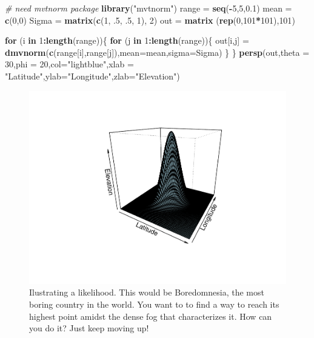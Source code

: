 \documentclass[
]{book}
\newenvironment{Shaded}{\begin{snugshade}}{\end{snugshade}}
\newcommand{\AttributeTok}[1]{\textcolor[rgb]{0.13,0.29,0.53}{#1}}
\newcommand{\CommentTok}[1]{\textcolor[rgb]{0.56,0.35,0.01}{\textit{#1}}}
\newcommand{\ControlFlowTok}[1]{\textcolor[rgb]{0.13,0.29,0.53}{\textbf{#1}}}
\newcommand{\DecValTok}[1]{\textcolor[rgb]{0.00,0.00,0.81}{#1}}
\newcommand{\FloatTok}[1]{\textcolor[rgb]{0.00,0.00,0.81}{#1}}
\newcommand{\FunctionTok}[1]{\textcolor[rgb]{0.13,0.29,0.53}{\textbf{#1}}}
\newcommand{\NormalTok}[1]{#1}
\newcommand{\OtherTok}[1]{\textcolor[rgb]{0.56,0.35,0.01}{#1}}
\newcommand{\SpecialCharTok}[1]{\textcolor[rgb]{0.81,0.36,0.00}{\textbf{#1}}}
\newcommand{\StringTok}[1]{\textcolor[rgb]{0.31,0.60,0.02}{#1}}
\begin{document}
\begin{Shaded}
\begin{Highlighting}[]
\CommentTok{\# need mvtnorm package}
\FunctionTok{library}\NormalTok{(}\StringTok{"mvtnorm"}\NormalTok{)}
\NormalTok{range }\OtherTok{=} \FunctionTok{seq}\NormalTok{(}\SpecialCharTok{{-}}\DecValTok{5}\NormalTok{,}\DecValTok{5}\NormalTok{,}\FloatTok{0.1}\NormalTok{)}
\NormalTok{mean }\OtherTok{=} \FunctionTok{c}\NormalTok{(}\DecValTok{0}\NormalTok{,}\DecValTok{0}\NormalTok{)}
\NormalTok{Sigma }\OtherTok{=} \FunctionTok{matrix}\NormalTok{(}\FunctionTok{c}\NormalTok{(}\DecValTok{1}\NormalTok{, .}\DecValTok{5}\NormalTok{, .}\DecValTok{5}\NormalTok{, }\DecValTok{1}\NormalTok{), }\DecValTok{2}\NormalTok{)}
\NormalTok{out }\OtherTok{=} \FunctionTok{matrix}\NormalTok{ (}\FunctionTok{rep}\NormalTok{(}\DecValTok{0}\NormalTok{,}\DecValTok{101}\SpecialCharTok{*}\DecValTok{101}\NormalTok{),}\DecValTok{101}\NormalTok{)}

\ControlFlowTok{for}\NormalTok{ (i }\ControlFlowTok{in} \DecValTok{1}\SpecialCharTok{:}\FunctionTok{length}\NormalTok{(range))\{}
    \ControlFlowTok{for}\NormalTok{ (j }\ControlFlowTok{in} \DecValTok{1}\SpecialCharTok{:}\FunctionTok{length}\NormalTok{(range))\{}
\NormalTok{        out[i,j] }\OtherTok{=} \FunctionTok{dmvnorm}\NormalTok{(}\FunctionTok{c}\NormalTok{(range[i],range[j]),}\AttributeTok{mean=}\NormalTok{mean,}\AttributeTok{sigma=}\NormalTok{Sigma)}
\NormalTok{    \}}
\NormalTok{\}}
 \FunctionTok{persp}\NormalTok{(out,}\AttributeTok{theta =} \DecValTok{30}\NormalTok{,}\AttributeTok{phi =} \DecValTok{20}\NormalTok{,}\AttributeTok{col=}\StringTok{"lightblue"}\NormalTok{,}\AttributeTok{xlab =} \StringTok{"Latitude"}\NormalTok{,}\AttributeTok{ylab=}\StringTok{"Longitude"}\NormalTok{,}\AttributeTok{zlab=}\StringTok{"Elevation"}\NormalTok{)}
\end{Highlighting}
\end{Shaded}

\begin{figure}

{\centering \includegraphics[width=0.8\linewidth]{ECOMODbook_files/figure-latex/country-1} 

}

\caption{Ilustrating a likelihood. This would be Boredomnesia, the most boring country in the world. You want to to find a way to reach its highest point amidst the dense fog that characterizes it. How can you do it? Just keep moving up!}\label{fig:country}
\end{figure}
\end{document}
